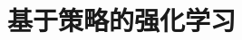 \setcounter{chapter}{11}

\hypertarget{ux57faux4e8eux7b56ux7565ux7684ux5f3aux5316ux5b66ux4e60}{%
\chapter{基于策略的强化学习}\label{ux57faux4e8eux7b56ux7565ux7684ux5f3aux5316ux5b66ux4e60}}
